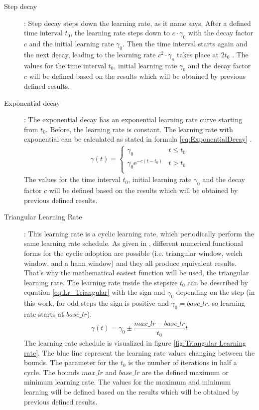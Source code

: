 \documentclass[12pt,DIV14,BCOR12mm,a4paper,footexclude,headinclude,halfparskip-,twoside,openright,cleardoubleempty,idxtotoc,bibtotoc,listtotoc]{scrreprt} %
\numberwithin{equation}{chapter}
\begin{document}
\begin{description}
	\begin{description}
		\item[Step decay]: Step decay steps down the learning rate, as it name says. After a defined time interval $t_0$, the learning rate steps down to $c\cdot\gamma_0$ with the decay factor $c$ and the initial learning rate $\gamma_0$. Then the time interval starts again and the next decay, leading to the learning rate $c^2\cdot\gamma_o$ takes place at $2t_0$ \cite{LectureNotes_DeepLearning}. The values for the time interval $t_0$, initial learning rate $\gamma_0$ and the decay factor $c$ will be defined based on the results which will be obtained by previous defined results.
		\item[Exponential decay]: The exponential decay has an exponential learning rate curve starting from $t_0$. Before, the learning rate is constant. The learning rate with exponential can be calculated as stated in formula \ref{eq:ExponentialDecay} \cite{LectureNotes_DeepLearning}.
		\begin{align}
			\gamma(t) = \begin{cases} \gamma_0 & t \leq t_0\\\gamma_0\textrm{e}^{-c(t-t_0)} & t > t_0\\ \end{cases}\label{eq:ExponentialDecay}
		\end{align}
		The values for the time interval $t_0$, initial learning rate $\gamma_0$ and the decay factor $c$ will be defined based on the results which will be obtained by previous defined results.
		\item[Triangular Learning Rate]: This learning rate is a cyclic learning rate, which periodically perform the same learning rate schedule. As given in \cite{Smith15CyclicLearningRate}, different numerical functional forms for the cyclic adoption are possible (i.e. triangular window, welch window, and a hann window) and they all produce equivalent results. That's why the mathematical easiest function will be used, the triangular learning rate. The learning rate inside the stepsize $t_0$ can be described by equation \ref{eq:Lr_Triangular} with the sign and $\gamma_0$ depending on the step (in this work, for odd steps the sign is positive and $\gamma_0 = base\_lr$, so learning rate starts at $base\_lr$).
		\begin{align}
			\gamma(t) = \gamma_0\pm\dfrac{max\_lr-base\_lr}{t_0}t\label{eq:Lr_Triangular}
		\end{align}		
		The learning rate schedule is visualized in figure \ref{fig:Triangular Learning rate}. The blue line represent the learning rate values changing between the bounds. The parameter for the $t_0$ is the number of iterations in half a cycle. The bounds $max\_lr$ and $base\_lr$ are the defined maximum or minimum learning rate. The values for the maximum and minimum learning will be defined based on the results which will be obtained by previous defined results.

\end{description}
\end{description}
\end{document}
